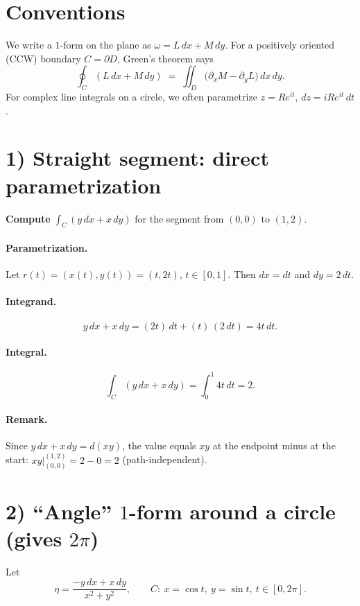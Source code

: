 \documentclass[11pt]{article}
\begin{document}
	
\section*{Conventions}
We write a $1$-form on the plane as $\omega=L\,dx+M\,dy$. For a positively oriented (CCW) boundary
$C=\partial D$, Green's theorem says
\[
\oint_{C} (L\,dx+M\,dy)
\;=\;
\iint_{D} \bigl(\partial_x M - \partial_y L\bigr)\,dx\,dy.
\]
For complex line integrals on a circle, we often parametrize $z=Re^{it}$, $dz=iRe^{it}\,dt$.

\bigskip

\section*{1) Straight segment: direct parametrization}
\textbf{Compute} $\displaystyle \int_{C}(y\,dx+x\,dy)$ for the segment from $(0,0)$ to $(1,2)$.

\paragraph{Parametrization.}
Let $r(t)=(x(t),y(t))=(t,2t)$, $t\in[0,1]$. Then $dx=dt$ and $dy=2\,dt$.

\paragraph{Integrand.}
\[
y\,dx+x\,dy
=
(2t)\,dt+(t)\,(2\,dt)
=
4t\,dt.
\]

\paragraph{Integral.}
\[
\int_{C}(y\,dx+x\,dy)
=
\int_{0}^{1} 4t\,dt
=
2.
\]

\paragraph{Remark.}
Since $y\,dx+x\,dy=d(xy)$, the value equals $xy$ at the endpoint minus at the start:
$xy\big|_{(0,0)}^{(1,2)}=2-0=2$ (path-independent).

\bigskip

\section*{2) ``Angle'' $1$-form around a circle (gives $2\pi$)}
Let
\[
\eta=\frac{-y\,dx+x\,dy}{x^{2}+y^{2}},
\qquad
C:\ x=\cos t,\ y=\sin t,\ t\in[0,2\pi].
\]
\end{document}
